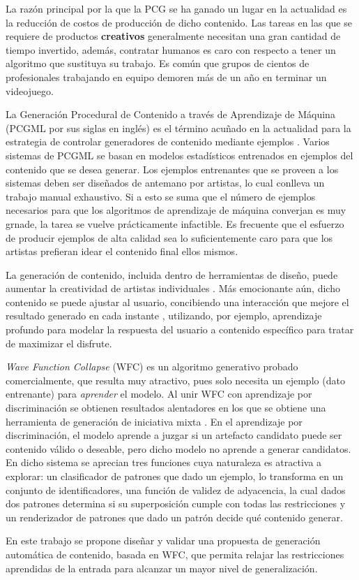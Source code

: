 La razón principal por la que la PCG se ha ganado un lugar en la actualidad
es la reducción de costos de producción de dicho contenido. Las tareas en las que se
requiere de productos \textbf{creativos} generalmente necesitan
una gran cantidad de tiempo invertido, además,
contratar humanos es caro con respecto a tener un algoritmo
que sustituya su trabajo. Es común que grupos de cientos
de profesionales trabajando en equipo demoren más de un año en terminar un videojuego.

La Generación Procedural de Contenido a través de Aprendizaje de Máquina (PCGML por sus siglas en inglés)
es el término acuñado en la actualidad para la estrategia de controlar
generadores de contenido mediante ejemplos \cite{bib:1}. Varios sistemas
de PCGML se basan en modelos estadísticos entrenados en ejemplos
del contenido que se desea generar. Los ejemplos entrenantes que se proveen
a los sistemas deben ser diseñados de antemano por artistas, lo cual
conlleva un trabajo manual exhaustivo. Si a esto se suma que el número
de ejemplos necesarios para que los algoritmos de aprendizaje de máquina
converjan es muy grnade, la tarea se vuelve prácticamente infactible.
Es frecuente que el esfuerzo de producir ejemplos de alta calidad
sea lo suficientemente caro para que los artistas prefieran idear
el contenido final ellos mismos.

La generación de contenido, incluida dentro de herramientas de diseño,
puede aumentar la creatividad de artistas individuales \cite{bib:4}.
Más emocionante aún, dicho contenido se puede ajustar al usuario,
concibiendo una interacción que mejore el resultado generado
en cada instante \cite{bib:7}, utilizando,
por ejemplo, aprendizaje profundo para modelar la respuesta
del usuario a contenido específico para tratar de maximizar
el disfrute.

\textit{Wave Function Collapse} (WFC) \cite{bib:2} es un algoritmo generativo probado
comercialmente, que resulta muy atractivo, pues
solo necesita un ejemplo (dato entrenante) para \textit{aprender} el modelo.
Al unir WFC con aprendizaje por discriminación se obtienen resultados
alentadores \cite{bib:3} en los que se obtiene una herramienta de generación
de iniciativa mixta \cite{bib:4}. En el aprendizaje por 
discriminación, el modelo aprende a juzgar si un artefacto candidato
puede ser contenido válido o deseable, pero dicho modelo no aprende
a generar candidatos.
En dicho sistema se aprecian tres funciones
cuya naturaleza es atractiva a explorar: un clasificador de patrones 
que dado un ejemplo, lo transforma en un conjunto de identificadores,
una función de validez de adyacencia, la cual dados dos patrones determina
si su superposición cumple con todas las restricciones y un 
renderizador de patrones que dado un patrón decide qué contenido generar.

En este trabajo se propone diseñar y validar una propuesta de generación
automática de contenido, basada en WFC, que permita relajar las restricciones 
aprendidas de la entrada para alcanzar un mayor nivel de generalización.



